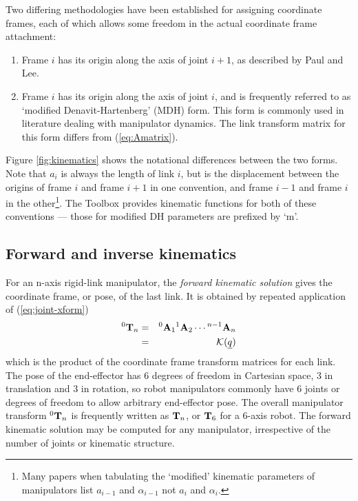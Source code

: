 \documentclass{article}
\newcommand{\DEF}[1]{{\it#1}}
\renewcommand{\vec}[1]{\underline{#1}}
\begin{document}
Two differing methodologies have been established for assigning coordinate frames,
each of which allows some freedom in the actual coordinate
frame attachment:\label{sec:kine-conventions}
\begin{enumerate}
\item Frame $i$ has its origin along the axis of joint $i+1$, as described
by Paul\cite{Paul81a} and Lee\cite{Fu87,Lee82a}.
\item Frame $i$ has its origin along the axis of joint $i$, and is frequently
referred to as `modified Denavit-Hartenberg' (MDH) form\cite{Craig89}.
This form is commonly used in literature dealing with manipulator dynamics.
The link transform matrix for this form differs from (\ref{eq:Amatrix}).
\end{enumerate}
Figure \ref{fig:kinematics} shows the notational differences between
the two forms.  Note that $a_i$ is always the length of link $i$, but is
the displacement between the origins of frame $i$ and frame $i+1$ in one
convention, and frame $i-1$ and frame $i$ in the other\footnote{
Many papers when tabulating the `modified' kinematic parameters
of manipulators list $a_{i-1}$ and $\alpha_{i-1}$ not $a_i$ and $\alpha_i$.}.
The Toolbox provides kinematic functions for both of these
conventions --- those for modified DH parameters are prefixed by `m'.

\subsection{Forward and inverse kinematics}
For an n-axis rigid-link manipulator, the \DEF{forward kinematic solution} gives
the coordinate frame, or pose, of the last link.
It is obtained
by repeated application of (\ref{eq:joint-xform})
\begin{eqnarray}
{}^0 {\bf T}_n &=& {}^0 {\bf A}_1 {}^1 {\bf A}_2 \cdots {}^{n-1}{\bf A}_n \\
    &=& {\cal K}(\vec{q}) 
\end{eqnarray}
which is the product of the coordinate frame transform matrices for each link.
The pose of the end-effector has 6 degrees of freedom in Cartesian space,
3 in translation and 3 in rotation, so robot manipulators commonly have 6
joints or degrees of freedom to allow arbitrary end-effector pose.
The overall manipulator transform ${}^0 {\bf T}_n$ is frequently written as
${\bf T}_n$, or ${\bf T}_6$ for a 6-axis robot.
The forward kinematic solution may be computed for any manipulator, irrespective 
of the number of joints or kinematic structure.
\end{document}
